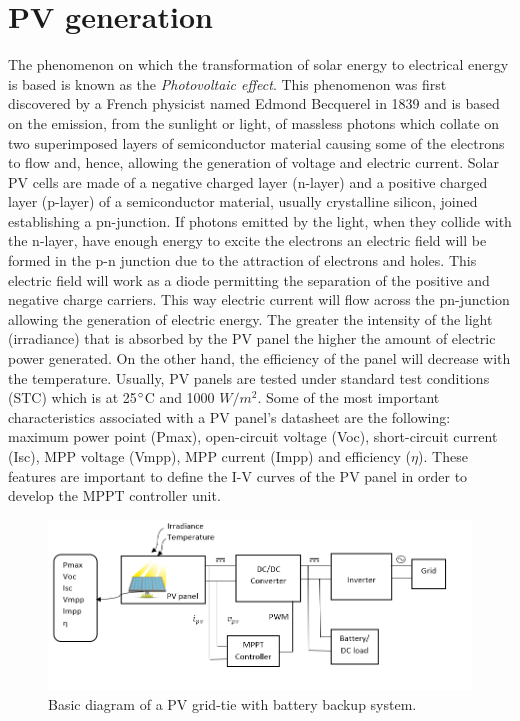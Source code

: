 \section{PV generation}

The phenomenon on which the transformation of solar energy to electrical energy is based is known as the \textit{Photovoltaic effect}. This phenomenon was first discovered by a French physicist named Edmond Becquerel in 1839 and is based on the emission, from the sunlight or light, of massless photons which collate on two superimposed layers of semiconductor material causing some of the electrons to flow and, hence, allowing the generation of voltage and electric current. Solar PV cells are made of a negative charged layer (n-layer) and a positive charged layer (p-layer) of a semiconductor material, usually crystalline silicon, joined establishing a pn-junction. If photons emitted by the light, when they collide with the n-layer,  have enough energy to excite the electrons an electric field will be formed in the p-n junction due to the attraction of electrons and holes. This electric field will work as a diode permitting the separation of the positive and negative charge carriers.  This way electric current will flow across the pn-junction allowing the generation of electric energy. %
The greater the intensity of the light (irradiance) that is absorbed by the PV panel the higher the amount of electric power generated. On the other hand, the efficiency of the panel will decrease with the temperature. Usually, PV panels are tested under standard test conditions (STC) which is at 25$\dec$C and 1000 $W/ m^2$. %
Some of the most important characteristics associated with a PV panel’s datasheet are the following: maximum power point (Pmax), open-circuit voltage (Voc), short-circuit current (Isc), MPP voltage (Vmpp), MPP current (Impp) and efficiency ($\eta$).  %
These features are important to define the I-V curves of the PV panel in order to develop the MPPT controller unit.

\begin{figure}[htbp]
	\includegraphics[width=\linewidth]{../Pictures/PV_system_blocks}
	\caption{Basic diagram of a PV grid-tie with battery backup system.}
	\label{fig:PVsystemblocks}
\end{figure}

